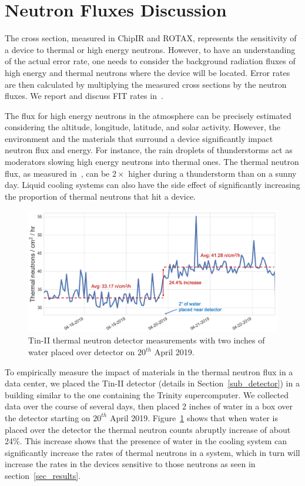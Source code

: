 
\section{Neutron Fluxes Discussion}
\label{sec_fit}

The cross section, measured in ChipIR and ROTAX, represents the sensitivity of a device to thermal or high energy neutrons. However, to have an understanding of the actual error rate, one needs to consider the background radiation fluxes of high energy and thermal neutrons where the device will be located. Error rates are then calculated by multiplying the measured cross sections by the neutron fluxes. We report and discuss FIT rates in~\cite{jsc2020}.

The flux for high energy neutrons in the atmosphere can be precisely estimated considering the altitude, longitude, latitude, and solar activity. However, the environment and the materials that surround a device significantly impact neutron flux and energy.  For instance, the rain droplets of thunderstorms act as moderators slowing high energy neutrons into thermal ones. The thermal neutron flux, as measured in~\cite{ziegler2003}, can be $2\times$ higher during a thunderstorm than on a sunny day. Liquid cooling systems can also have the side effect of significantly increasing the proportion of thermal neutrons that hit a device.

\begin{figure}[tb] 
\centering
\includegraphics[width=0.82\columnwidth]{./figs/turkeypan_PR}
\caption{Tin-II thermal neutron detector measurements with two inches of water placed over detector on $20^{th}$ April 2019.}
\label{turkeypan}

\end{figure}
\label{sub_flux}
To  empirically measure the impact of materials in the thermal neutron flux in a data center, we placed the Tin-II detector (details in Section~\ref{sub_detector}) in a building similar to the one containing the Trinity supercomputer. We collected data over the course of several days, then placed 2 inches of water in a box over the detector starting on $20^{th}$ April 2019. Figure~\ref{turkeypan} shows that when water is placed over the detector the thermal neutron counts abruptly increase of about 24\%. This increase shows that the presence of water in the cooling system can significantly increase the rates of thermal neutrons in a system, which in turn will increase the rates in the devices sensitive to those neutrons as seen in section~\ref{sec_results}. 

